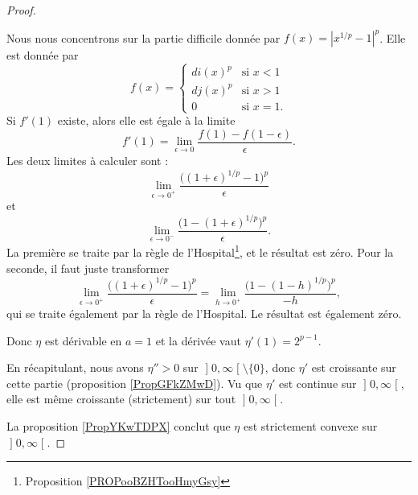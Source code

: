 \begin{proof}
\begin{subproof}
				Nous nous concentrons sur la partie difficile donnée par \( f(x)=| x^{1/p}-1 |^p\). Elle est donnée par
				\begin{equation}
					f(x)=\begin{cases}
						di(x)^p & \text{si } x<1  \\
						dj(x)^p & \text{si } x>1  \\
						0       & \text{si } x=1.
					\end{cases}
				\end{equation}
				Si \( f'(1)\) existe, alors elle est égale à la limite
				\begin{equation}
					f'(1)=\lim_{\epsilon\to 0}\frac{ f(1)-f(1-\epsilon) }{ \epsilon }.
				\end{equation}
				Les deux limites à calculer sont :
				\begin{equation}
					\lim_{\epsilon\to 0^+}\frac{ \big( (1+\epsilon)^{1/p}-1 \big)^p }{ \epsilon }
				\end{equation}
				et
				\begin{equation}
					\lim_{\epsilon\to 0^-}\frac{ \big( 1-(1+\epsilon)^{1/p} \big)^p }{ \epsilon }.
				\end{equation}
				La première se traite par la règle de l'Hospital\footnote{Proposition \ref{PROPooBZHTooHmyGsy}}, et le résultat est zéro. Pour la seconde, il faut juste transformer
				\begin{equation}
					\lim_{\epsilon\to 0^+}\frac{ \big( (1+\epsilon)^{1/p}-1 \big)^p }{ \epsilon }=\lim_{h\to 0^+} \frac{ \big( 1-(1-h)^{1/p} \big)^p }{ -h },
				\end{equation}
				qui se traite également par la règle de l'Hospital. Le résultat est également zéro.

				Donc \( \eta\) est dérivable en \( a=1\) et la dérivée vaut \(\eta'(1)= 2^{p-1}\).
			\end{subproof}
			En récapitulant, nous avons \( \eta''>0\) sur \( \mathopen] 0  , \infty \mathclose[\setminus\{ 0 \}\), donc \( \eta'\) est croissante sur cette partie (proposition \ref{PropGFkZMwD}). Vu que \( \eta'\) est continue sur \( \mathopen] 0 , \infty \mathclose[\), elle est même croissante (strictement) sur tout \( \mathopen] 0 , \infty \mathclose[\).

			La proposition \ref{PropYKwTDPX} conclut que \( \eta\) est strictement convexe sur \( \mathopen] 0 , \infty \mathclose[\).
	\end{proof}

